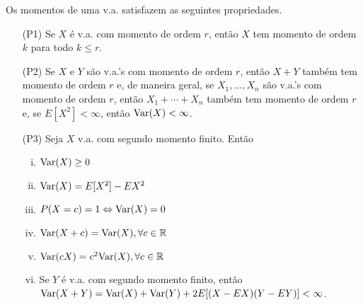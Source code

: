 \documentclass[../Notas.tex]{subfiles}
\begin{document}
\begin{proposition}
Os momentos de uma v.a. satisfazem as seguintes propriedades.
\begin{itemize}
    \item[(P1)] Se $X$ é v.a. com momento de ordem $r$, então $X$ tem momento de ordem $k$ para todo $k\leq r$.
    \item[(P2)] Se $X$ e $Y$ são v.a.'s com momento de ordem $r$, então $X+Y$ também tem momento de ordem $r$ e, de maneira geral, se $X_1, \dots, X_n$ são v.a.'s com momento de ordem $r$, então $X_1+\cdots+X_n$ também tem momento de ordem $r$ e, se $E[X^2] < \infty$, então $\text{Var}(X) < \infty$.
    \item[(P3)] Seja $X$ v.a. com segundo momento finito. Então
    \begin{enumerate}[(i)]
        \item $\text{Var}(X) \geq 0$
        \item $\text{Var}(X) = E[X^2] - EX^2$
        \item $P(X=c) = 1 \Leftrightarrow \text{Var}(X) = 0$
        \item $\text{Var}(X+c) = \text{Var}(X), \forall c\in\mathbb{R}$
        \item $\text{Var}(cX) = c^2\text{Var}(X), \forall c\in\mathbb{R}$
        \item Se $Y$ é v.a. com segundo momento finito, então $\text{Var}(X+Y) = \text{Var}(X) + \text{Var}(Y) + 2E[(X-EX)(Y-EY)] < \infty$.
    \end{enumerate}
\end{itemize}
\end{proposition}
\end{document}
